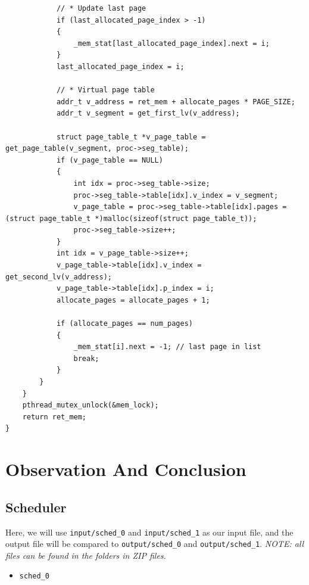 \documentclass[a4paper]{article}
\numberwithin{equation}{section}
\begin{document}
\begin{mdframed}[leftline=false,rightline=false,backgroundcolor=blue!10,nobreak=false]
\begin{verbatim}
            // * Update last page
            if (last_allocated_page_index > -1)
            {
                _mem_stat[last_allocated_page_index].next = i;
            }
            last_allocated_page_index = i;

            // * Virtual page table
            addr_t v_address = ret_mem + allocate_pages * PAGE_SIZE;
            addr_t v_segment = get_first_lv(v_address);

            struct page_table_t *v_page_table = get_page_table(v_segment, proc->seg_table);
            if (v_page_table == NULL)
            {
                int idx = proc->seg_table->size;
                proc->seg_table->table[idx].v_index = v_segment;
                v_page_table = proc->seg_table->table[idx].pages = (struct page_table_t *)malloc(sizeof(struct page_table_t));
                proc->seg_table->size++;
            }
            int idx = v_page_table->size++;
            v_page_table->table[idx].v_index = get_second_lv(v_address);
            v_page_table->table[idx].p_index = i;
            allocate_pages = allocate_pages + 1;

            if (allocate_pages == num_pages)
            {
                _mem_stat[i].next = -1; // last page in list
                break;
            }
        }
    }
    pthread_mutex_unlock(&mem_lock);
    return ret_mem;
}
  \end{verbatim}
\end{mdframed}


\section{Observation And Conclusion}

\subsection{Scheduler}

Here, we will use \texttt{input/sched_0} and \texttt{input/sched_1} as our input file, and the output file will be compared to \texttt{output/sched_0} and \texttt{output/sched_1}.
\textit{NOTE: all files can be found in the folders in ZIP files.}

\begin{itemize}
    \item \texttt{sched_0}
\end{itemize}
\end{document}
